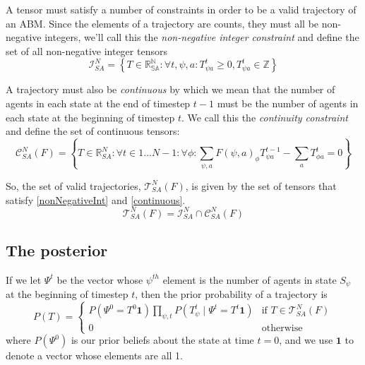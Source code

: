 \documentclass{article}
\begin{document}
A tensor must satisfy a number of constraints in order to be a valid trajectory of an ABM. Since the elements of a trajectory are counts, they must all be non-negative integers, we'll call this the \textit{non-negative integer constraint} and define the set of all non-negative integer tensors
\begin{equation}
\mathcal{I}^N_{SA} = \left\{ T \in \mathbb{R^N_{SA}}: \forall t,\psi, a: T^t_{\psi a} \ge 0, T^t_{\psi a} \in \mathbb{Z}\right\}
\label{nonNegativeInt}
\end{equation}

A trajectory must also be \textit{continuous} by which we mean that the number of agents in each state at the end of timestep $t-1$ must be the number of agents in each state at the beginning of timestep $t$. We call this the \textit{continuity constraint} and define the set of continuous tensors:
\begin{equation}
\mathcal{C}^N_{SA}(F) = \left\{T\in\mathbb{R}^N_{SA}:  \forall t \in 1 ... N-1:\forall \phi: \sum_{\psi, a} F(\psi, a)_\phi T^{t-1}_{\psi a} - \sum_a T^t_{\phi a} = 0\right\}
\label{continuous}
\end{equation}

So, the set of valid trajectories, $\mathcal{T}^N_{SA}(F)$, is given by the set of tensors that satisfy \ref{nonNegativeInt} and \ref{continuous}.
\begin{equation}
\mathcal{T}^N_{SA}(F) = \mathcal{I}^N_{SA} \cap \mathcal{C}^N_{SA}(F)
\end{equation}


\subsection{The posterior}

If we let $\Psi^t$ be the vector whose $\psi^{th}$ element is the number of agents in state $S_\psi$ at the beginning of timestep $t$, then the prior probability of a trajectory is
\[
P(T) =
\begin{cases}
P\left(\Psi^0 = T^0 \mathbf{1} \right) \prod_{\psi, t} P\left(T^t_{\psi} \mid \Psi^t = T^t \mathbf{1}\right) & \text{if } T \in \mathcal{T}^N_{SA}(F) \\
0 & \text{otherwise}
\end{cases}
\]
where $P(\Psi^0)$ is our prior beliefs about the state at time $t=0$, and we use $\mathbf{1}$ to denote a vector whose elements are all 1.
\end{document}
